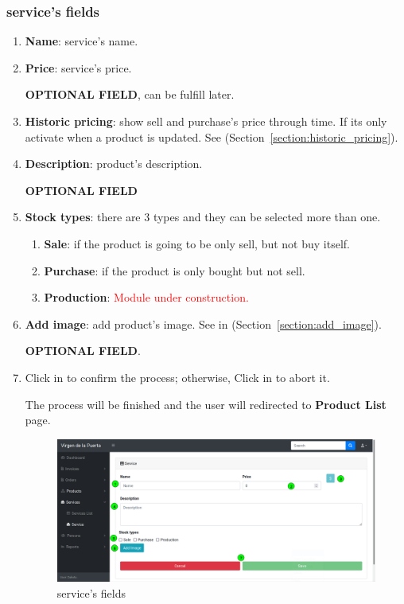 \documentclass[a4paper,11pt]{refart}
\newcommand\InConstruction{\textcolor{red}{Module under construction.}}
\begin{document}
\subsubsection{service's fields}
\begin{enumerate}
	\item \textbf{Name}: service's name.
	\item \textbf{Price}: service's price.
	\medskip
	\begin{leftbar}
		\textbf{OPTIONAL FIELD}, can be fulfill later.
	\end{leftbar}
	\item \textbf{Historic pricing}: show sell and purchase's price through time. If its only activate when a product is updated. See (Section~\ref{section:historic_pricing}).
	\item \textbf{Description}: product's description.
	\medskip
	\begin{leftbar}
		\textbf{OPTIONAL FIELD}
	\end{leftbar}
	\item \textbf{Stock types}: there are 3 types and they can be selected more than one.
		\begin{enumerate}
			\item \textbf{Sale}: if the product is going to be only sell, but not buy itself.
			\item \textbf{Purchase}: if the product is only bought but not sell.
			\item \textbf{Production}:  \InConstruction{}
		\end{enumerate}
	\item \textbf{Add image}: add product's image. See in (Section~\ref{section:add_image}).
	\medskip
	\begin{leftbar}
		\textbf{OPTIONAL FIELD}.
	\end{leftbar}
	\item Click in  to confirm the process; otherwise, Click in  to abort it.
		\medskip
		\begin{leftbar}
			The process will be finished and the user will redirected to \textbf{Product List} page.
		\end{leftbar}
	\begin{figure}[H]\centering
		\includegraphics[width=\textwidth]{images/service_form-fields.png}
		\caption{service's fields}
		\label{fig:service_form-fields}
	\end{figure}
\end{enumerate}
\end{document}

